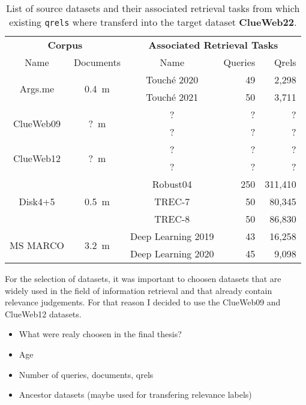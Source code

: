\begin{table}[h!]
    \centering
    \caption{List of source datasets and their associated retrieval tasks from which existing \texttt{qrels} where transferd into the target dataset \textbf{ClueWeb22}.}
    \begin{tabular}{cccrr}
        \toprule
        \multicolumn{2}{c}{\textbf{Corpus}} & \multicolumn{3}{c}{\textbf{ Associated Retrieval Tasks}} \\
        \cmidrule(lr){1-2} \cmidrule(lr){3-5}
        Name & Documents  & Name & Queries & Qrels \\
        \midrule
        
        \multirow{2}{*}{Args.me} & \multirow{2}{*}{0.4~m} & Touché 2020 & 49 & 2,298 \\
        & & Touché 2021 & 50 & 3,711\\

        \multirow{2}{*}{ClueWeb09} & \multirow{2}{*}{?~m} & ? & ? & ? \\
        & & ? & ? & ? \\

        \multirow{2}{*}{ClueWeb12} & \multirow{2}{*}{?~m} & ? & ? & ? \\
        & & ? & ? & ? \\

        \multirow{3}{*}{Disk4+5} & \multirow{3}{*}{0.5~m} & Robust04 & 250 & 311,410 \\
        & & TREC-7 & 50 & 80,345 \\
        & & TREC-8 & 50 & 86,830 \\

        \multirow{2}{*}{MS MARCO} & \multirow{2}{*}{3.2~m} & Deep Learning 2019 & 43 & 16,258 \\
        & & Deep Learning 2020 & 45 & 9,098 \\
        
        \bottomrule
    \end{tabular}
\end{table}

For the selection of datasets, it was important to choosen datasets that are widely used in the field of information retrieval and that already contain relevance judgements. For that reason I decided to use the ClueWeb09 and ClueWeb12 datasets.

\begin{itemize}
    \item What were realy choosen in the final thesis?
    \item Age
    \item Number of queries, documents, qrels
    \item Ancestor datasets (maybe used for transfering relevance labels)
\end{itemize}

